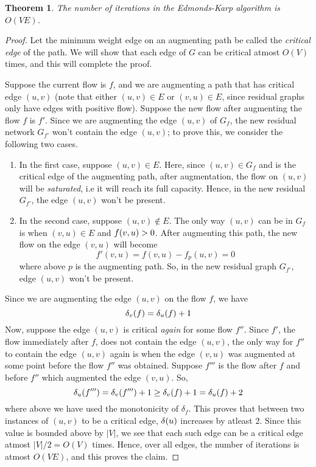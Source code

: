 \documentclass[12pt,a4paper]{amsart}
\numberwithin{equation}{section}
\newtheorem{Th}{Theorem}[section]
\theoremstyle{definition}
\begin{document}
\begin{Th}
	The number of iterations in the Edmonds-Karp algorithm is $O(VE)$. 
\end{Th}
\begin{proof}
	Let the minimum weight edge on an augmenting path be called the \textit{critical edge} of the path. We will show that each edge of $G$ can be critical atmost $O(V)$ times, and this will complete the proof. 
	
	Suppose the current flow is $f$, and we are augmenting a path that has critical edge $(u, v)$ (note that either $(u, v)\in E$ or $(v, u)\in E$, since residual graphs only have edges with positive flow). Suppose the new flow after augmenting the flow $f$ is $f'$. Since we are augmenting the edge $(u, v)$ of $G_f$, the new residual network $G_{f'}$ won't contain the edge $(u, v)$; to prove this, we consider the following two cases. 
	\begin{enumerate}
		\item In the first case, suppose $(u, v)\in E$. Here, since $(u, v)\in G_f$ and is the critical edge of the augmenting path, after augmentation, the flow on $(u, v)$ will be \textit{saturated}, i.e it will reach its full capacity. Hence, in the new residual $G_{f'}$, the edge $(u, v)$ won't be present. 
		\item In the second case, suppose $(u, v)\notin E$. The only way $(u, v)$ can be in $G_f$ is when $(v, u)\in E$ and $f(v, u) > 0$. After augmenting this path, the new flow on the edge $(v, u)$ will become 
		$$f'(v, u) = f(v, u) - f_p(u, v) = 0$$
		where above $p$ is the augmenting path. So, in the new residual graph $G_{f'}$, edge $(u, v)$ won't be present.
	\end{enumerate}
	Since we are augmenting the edge $(u, v)$ on the flow $f$, we have 
	$$\delta_{v}(f) = \delta_{u}(f) + 1$$
	Now, suppose the edge $(u, v)$ is critical \textit{again} for some flow $f''$. Since $f'$, the flow immediately after $f$, does not contain the edge $(u, v)$, the only way for $f''$ to contain the edge $(u, v)$ again is when the edge $(v, u)$ was augmented at some point before the flow $f''$ was obtained. Suppose $f'''$ is the flow after $f$ and before $f''$ which augmented the edge $(v, u)$. So, 
	$$\delta_{u}(f''') = \delta_{v}(f''') + 1 \ge \delta_{v}(f) + 1 = \delta_{u}(f) + 2$$
	where above we have used the monotonicity of $\delta_f$. This proves that between two instances of $(u, v)$ to be a critical edge, $\delta_{}(u)$ increases by atleast $2$. Since this value is bounded above by $|V|$, we see that each such edge can be a critical edge atmost $|V|/2 = O(V)$ times. Hence, over all edges, the number of iterations is atmost $O(VE)$, and this proves the claim. 
\end{proof}
\end{document}
